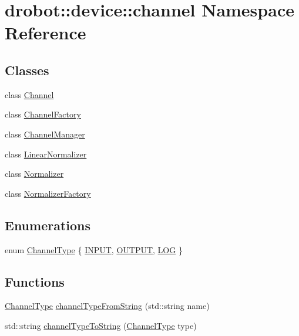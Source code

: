 \hypertarget{namespacedrobot_1_1device_1_1channel}{\section{drobot\-:\-:device\-:\-:channel Namespace Reference}
\label{namespacedrobot_1_1device_1_1channel}
}
\subsection*{Classes}
\begin{DoxyCompactItemize}
\item 
class \hyperlink{classdrobot_1_1device_1_1channel_1_1Channel}{Channel}
\item 
class \hyperlink{classdrobot_1_1device_1_1channel_1_1ChannelFactory}{Channel\-Factory}
\item 
class \hyperlink{classdrobot_1_1device_1_1channel_1_1ChannelManager}{Channel\-Manager}
\item 
class \hyperlink{classdrobot_1_1device_1_1channel_1_1LinearNormalizer}{Linear\-Normalizer}
\item 
class \hyperlink{classdrobot_1_1device_1_1channel_1_1Normalizer}{Normalizer}
\item 
class \hyperlink{classdrobot_1_1device_1_1channel_1_1NormalizerFactory}{Normalizer\-Factory}
\end{DoxyCompactItemize}
\subsection*{Enumerations}
\begin{DoxyCompactItemize}
\item 
enum \hyperlink{namespacedrobot_1_1device_1_1channel_ae9b8f192ae58c79b11f1d671d32f2177}{Channel\-Type} \{ \hyperlink{namespacedrobot_1_1device_1_1channel_ae9b8f192ae58c79b11f1d671d32f2177a976c66938ec47c779f921f899af4fbe4}{I\-N\-P\-U\-T}, 
\hyperlink{namespacedrobot_1_1device_1_1channel_ae9b8f192ae58c79b11f1d671d32f2177a3feb0ca76be5a9e17d0412c032f23648}{O\-U\-T\-P\-U\-T}, 
\hyperlink{namespacedrobot_1_1device_1_1channel_ae9b8f192ae58c79b11f1d671d32f2177a3e9b620d689886fe87bcff7f3df4ba35}{L\-O\-G}
 \}
\end{DoxyCompactItemize}
\subsection*{Functions}
\begin{DoxyCompactItemize}
\item 
\hyperlink{namespacedrobot_1_1device_1_1channel_ae9b8f192ae58c79b11f1d671d32f2177}{Channel\-Type} \hyperlink{namespacedrobot_1_1device_1_1channel_a46106945224647764a39387fa4b139a4}{channel\-Type\-From\-String} (std\-::string name)
\item 
std\-::string \hyperlink{namespacedrobot_1_1device_1_1channel_a30a804e58b0fecf4f74314f32906340d}{channel\-Type\-To\-String} (\hyperlink{namespacedrobot_1_1device_1_1channel_ae9b8f192ae58c79b11f1d671d32f2177}{Channel\-Type} type)
\end{DoxyCompactItemize}


